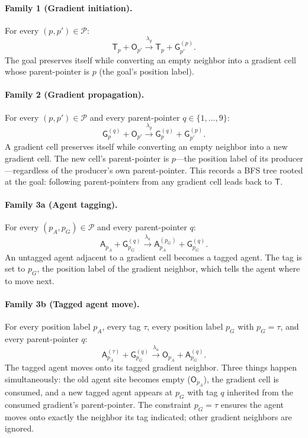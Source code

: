 \documentclass[11pt]{article}
\theoremstyle{plain}
\theoremstyle{definition}
\theoremstyle{remark}
\begin{document}
\paragraph{Family 1 (Gradient initiation).} For every $(p, p') \in \mathcal{P}$:
\[
\mathsf{T}_p + \mathsf{O}_{p'} \xrightarrow{\lambda_g} \mathsf{T}_p + \mathsf{G}^{(p)}_{p'}.
\]
The goal preserves itself while converting an empty neighbor into a gradient cell whose parent-pointer is $p$ (the goal's position label).

\paragraph{Family 2 (Gradient propagation).} For every $(p, p') \in \mathcal{P}$ and every parent-pointer $q \in \{1,\ldots,9\}$:
\[
\mathsf{G}^{(q)}_{p} + \mathsf{O}_{p'} \xrightarrow{\lambda_g} \mathsf{G}^{(q)}_{p} + \mathsf{G}^{(p)}_{p'}.
\]
A gradient cell preserves itself while converting an empty neighbor into a new gradient cell. The new cell's parent-pointer is $p$---the position label of its producer---regardless of the producer's own parent-pointer. This records a BFS tree rooted at the goal: following parent-pointers from any gradient cell leads back to $\mathsf{T}$.

\paragraph{Family 3a (Agent tagging).} For every $(p_A, p_G) \in \mathcal{P}$ and every parent-pointer $q$:
\[
\mathsf{A}_{p_A} + \mathsf{G}^{(q)}_{p_G} \xrightarrow{\lambda_a} \mathsf{A}^{(p_G)}_{p_A} + \mathsf{G}^{(q)}_{p_G}.
\]
An untagged agent adjacent to a gradient cell becomes a tagged agent. The tag is set to $p_G$, the position label of the gradient neighbor, which tells the agent where to move next.

\paragraph{Family 3b (Tagged agent move).} For every position label $p_A$, every tag $\tau$, every position label $p_G$ with $p_G = \tau$, and every parent-pointer $q$:
\[
\mathsf{A}^{(\tau)}_{p_A} + \mathsf{G}^{(q)}_{p_G} \xrightarrow{\lambda_a} \mathsf{O}_{p_A} + \mathsf{A}^{(q)}_{p_G}.
\]
The tagged agent moves onto its tagged gradient neighbor. Three things happen simultaneously: the old agent site becomes empty ($\mathsf{O}_{p_A}$), the gradient cell is consumed, and a new tagged agent appears at $p_G$ with tag $q$ inherited from the consumed gradient's parent-pointer. The constraint $p_G = \tau$ ensures the agent moves onto exactly the neighbor its tag indicated; other gradient neighbors are ignored.
\end{document}
